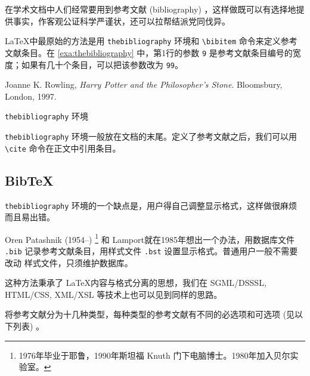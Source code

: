 在学术文档中人们经常要用到参考文献 (bibliography) ，这样做既可以有选择地提供事实，作客观公证科学严谨状，还可以拉帮结派党同伐异。

\LaTeX 中最原始的方法是用 
\texttt{thebibliography} 环境和 \verb|\bibitem| 命令来定义参考文献条目。在 \autoref{exa:thebibliography} 中，第1行的参数 \texttt{9} 是参考文献条目编号的宽度；如果有几十个条目，可以把该参数改为 \texttt{99}。

\begin{example}[htbp]
\begin{BTDemo}[]
\begin{thebibliography}{9}
  Joanne K. Rowling,
  \emph{Harry Potter and the Philosopher's Stone}.
  Bloomsbury, London,
  1997.
\end{thebibliography}
\end{BTDemo}
\caption{\texttt{thebibliography} 环境}
\label{exa:thebibliography}
\end{example}

\texttt{thebibliography} 环境一般放在文档的末尾。定义了参考文献之后，我们可以用 \verb|\cite| 命令在正文中引用条目。

\begin{RLDemo}[numbers=none]
\cite{Rowling_1997}
\end{RLDemo}

\subsection{BibTeX}

\texttt{thebibliography} 环境的一个缺点是，用户得自己调整显示格式，这样做很麻烦而且易出错。

Oren Patashnik (1954--)\indexPatashnik{} \footnote{1976年毕业于耶鲁，1990年斯坦福 Knuth 门下电脑博士。1980年加入贝尔实验室。} 和 Lamport\indexLamport 就在1985年想出一个办法，用数据库文件 \texttt{.bib} 记录参考文献条目，用样式文件 \texttt{.bst} 设置显示格式。普通用户一般不需要改动 样式文件，只须维护数据库。

这种方法秉承了 \LaTeX 内容与格式分离的思想，我们在 SGML/DSSSL, HTML/CSS, XML/XSL 等技术上也可以见到同样的思路。

\BibTeX 将参考文献分为十几种类型，每种类型的参考文献有不同的必选项和可选项 (见以下列表) 。


